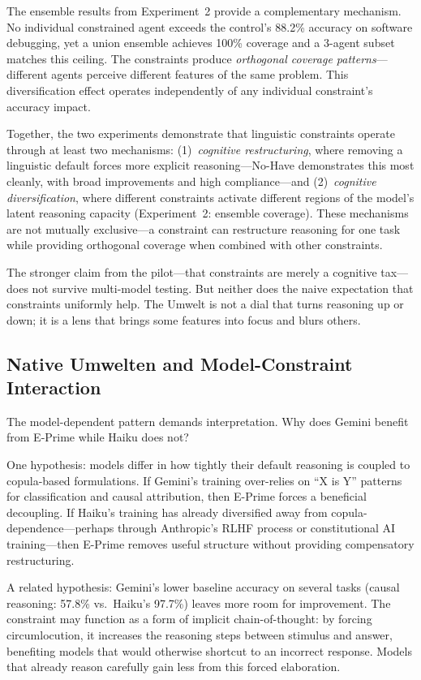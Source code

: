 \documentclass[11pt,a4paper]{article}
\begin{document}
The ensemble results from Experiment~2 provide a complementary mechanism. No individual constrained agent exceeds the control's 88.2\% accuracy on software debugging, yet a union ensemble achieves 100\% coverage and a 3-agent subset matches this ceiling. The constraints produce \emph{orthogonal coverage patterns}---different agents perceive different features of the same problem. This diversification effect operates independently of any individual constraint's accuracy impact.

Together, the two experiments demonstrate that linguistic constraints operate through at least two mechanisms: (1)~\emph{cognitive restructuring}, where removing a linguistic default forces more explicit reasoning---No-Have demonstrates this most cleanly, with broad improvements and high compliance---and (2)~\emph{cognitive diversification}, where different constraints activate different regions of the model's latent reasoning capacity (Experiment~2: ensemble coverage). These mechanisms are not mutually exclusive---a constraint can restructure reasoning for one task while providing orthogonal coverage when combined with other constraints.

The stronger claim from the pilot---that constraints are merely a cognitive tax---does not survive multi-model testing. But neither does the naive expectation that constraints uniformly help. The Umwelt is not a dial that turns reasoning up or down; it is a lens that brings some features into focus and blurs others.

\subsection{Native Umwelten and Model-Constraint Interaction}

The model-dependent pattern demands interpretation. Why does Gemini benefit from E-Prime while Haiku does not?

One hypothesis: models differ in how tightly their default reasoning is coupled to copula-based formulations. If Gemini's training over-relies on ``X is Y'' patterns for classification and causal attribution, then E-Prime forces a beneficial decoupling. If Haiku's training has already diversified away from copula-dependence---perhaps through Anthropic's RLHF process or constitutional AI training---then E-Prime removes useful structure without providing compensatory restructuring.

A related hypothesis: Gemini's lower baseline accuracy on several tasks (causal reasoning: 57.8\% vs.\ Haiku's 97.7\%) leaves more room for improvement. The constraint may function as a form of implicit chain-of-thought: by forcing circumlocution, it increases the reasoning steps between stimulus and answer, benefiting models that would otherwise shortcut to an incorrect response. Models that already reason carefully gain less from this forced elaboration.
\end{document}
